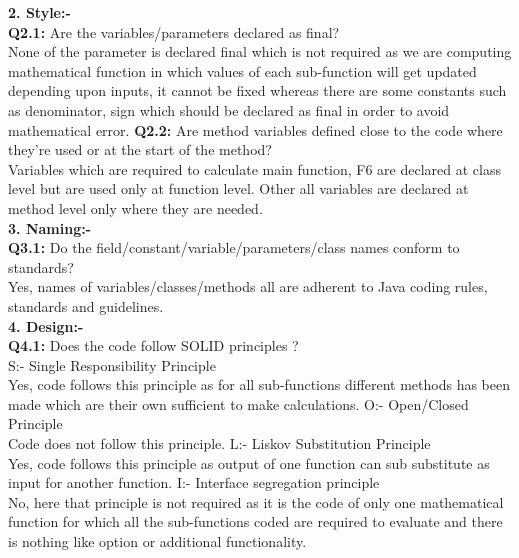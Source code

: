 \documentclass[10pt]{article}
\begin{document}
 \newline
 \textbf{2. Style:-}\\
\textbf{Q2.1:} Are the variables/parameters declared as final? \\
None of the parameter is declared final which is not required as we are computing mathematical function in which values of each sub-function will get updated depending upon inputs, it cannot be fixed whereas there are some constants such as denominator, sign which should be declared as final in order to avoid mathematical error.
\newline
\textbf{Q2.2:} Are method variables defined close to the code where they’re used or at the start of the method?\\
Variables which are required to calculate main function, F6 are declared at class level but are used only at function level. Other all variables are declared at method level only where they are needed.\\
\newline
 \textbf{3. Naming:-}\\ 
\textbf{Q3.1:} Do the field/constant/variable/parameters/class names conform to standards?\\
 Yes, names of variables/classes/methods all are adherent to Java coding rules, standards and guidelines.\\
\newline
\textbf{4. Design:-}\\
\textbf{Q4.1:} Does the code follow SOLID principles ?\\
S:- Single Responsibility Principle \\
Yes, code follows this principle as for all sub-functions different methods has been made which are their own sufficient to make calculations.
\newline
O:- Open/Closed Principle\\
Code does not follow this principle.
\newline
L:- Liskov Substitution Principle\\
Yes, code follows this principle as output of one function can sub substitute as input for another function.
\newline
I:- Interface segregation principle\\
No, here that principle is not required as it is the code of only one mathematical function for which all the sub-functions coded are required to evaluate and there is nothing like option or additional functionality.
\newline
\end{document}
